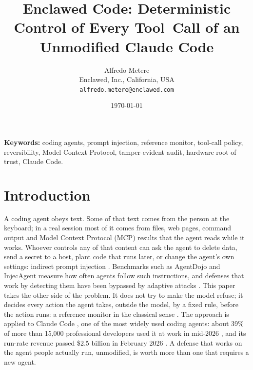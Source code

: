 \documentclass[11pt]{article}
\title{\bfseries Enclawed Code: Deterministic Control of Every Tool~Call of an Unmodified Claude Code}
\author{%
  Alfredo Metere\\
  Enclawed, Inc., California, USA\\
  \texttt{alfredo.metere@enclawed.com}
}
\date{\today}
\begin{document}
\maketitle



\noindent\textbf{Keywords:} coding agents, prompt injection, reference
monitor, tool-call policy, reversibility, Model Context Protocol,
tamper-evident audit, hardware root of trust, Claude Code.

\section{Introduction}
\label{sec:intro}

A coding agent obeys text. Some of that text comes from the person at
the keyboard; in a real session most of it comes from files, web pages,
command output and Model Context Protocol (MCP) results that the agent
reads while it works. Whoever controls any of that content can ask the
agent to delete data, send a secret to a host, plant code that runs
later, or change the agent's own settings: indirect prompt injection
\cite{greshake2023indirect,owasp2025llm}. Benchmarks such as AgentDojo
\cite{debenedetti2024agentdojo} and InjecAgent \cite{zhan2024injecagent}
measure how often agents follow such instructions, and defenses that
work by detecting them have been bypassed by adaptive attacks
\cite{zhan2025adaptive,nasr2025attacker}. This paper takes the other
side of the problem. It does not try to make the model refuse; it decides
every action the agent takes, outside the model, by a fixed rule, before
the action runs: a reference monitor in the classical sense
\cite{anderson1972,saltzer1975protection}. The approach is applied to
Claude Code \cite{cc-hooks}, one of the most widely used coding agents:
about 39\% of more than 15{,}000 professional developers used it at work
in mid-2026 \cite{jetbrains2026agents}, and its run-rate revenue passed
\$2.5 billion in February 2026 \cite{anthropic2026seriesg}. A defense
that works on the agent people actually run, unmodified, is worth more
than one that requires a new agent.
\end{document}
